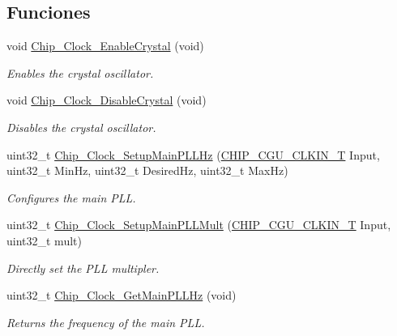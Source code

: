 \subsection*{Funciones}
\begin{DoxyCompactItemize}
\item 
void \hyperlink{group___c_l_o_c_k__18_x_x__43_x_x_gaa74040cd24046b7e09cbb2c1cf6e6c0d}{Chip\+\_\+\+Clock\+\_\+\+Enable\+Crystal} (void)
\begin{DoxyCompactList}\small\item\em Enables the crystal oscillator. \end{DoxyCompactList}\item 
void \hyperlink{group___c_l_o_c_k__18_x_x__43_x_x_gadbc79ec252fc8518b284aff51e86adf5}{Chip\+\_\+\+Clock\+\_\+\+Disable\+Crystal} (void)
\begin{DoxyCompactList}\small\item\em Disables the crystal oscillator. \end{DoxyCompactList}\item 
uint32\+\_\+t \hyperlink{group___c_l_o_c_k__18_x_x__43_x_x_ga1667168db76064ac1c2bebd3dfa6db6d}{Chip\+\_\+\+Clock\+\_\+\+Setup\+Main\+P\+L\+L\+Hz} (\hyperlink{group___c_l_o_c_k__18_x_x__43_x_x_ga0975326707efebf2b074283e6c602f18}{C\+H\+I\+P\+\_\+\+C\+G\+U\+\_\+\+C\+L\+K\+I\+N\+\_\+T} Input, uint32\+\_\+t Min\+Hz, uint32\+\_\+t Desired\+Hz, uint32\+\_\+t Max\+Hz)
\begin{DoxyCompactList}\small\item\em Configures the main P\+LL. \end{DoxyCompactList}\item 
uint32\+\_\+t \hyperlink{group___c_l_o_c_k__18_x_x__43_x_x_ga02f88a46ae6e2b942e8c5fd58915634e}{Chip\+\_\+\+Clock\+\_\+\+Setup\+Main\+P\+L\+L\+Mult} (\hyperlink{group___c_l_o_c_k__18_x_x__43_x_x_ga0975326707efebf2b074283e6c602f18}{C\+H\+I\+P\+\_\+\+C\+G\+U\+\_\+\+C\+L\+K\+I\+N\+\_\+T} Input, uint32\+\_\+t mult)
\begin{DoxyCompactList}\small\item\em Directly set the P\+LL multipler. \end{DoxyCompactList}\item 
uint32\+\_\+t \hyperlink{group___c_l_o_c_k__18_x_x__43_x_x_gac52f49ae117b1091809cb24f18481b86}{Chip\+\_\+\+Clock\+\_\+\+Get\+Main\+P\+L\+L\+Hz} (void)
\begin{DoxyCompactList}\small\item\em Returns the frequency of the main P\+LL. \end{DoxyCompactList}\item 

\end{DoxyCompactItemize}
